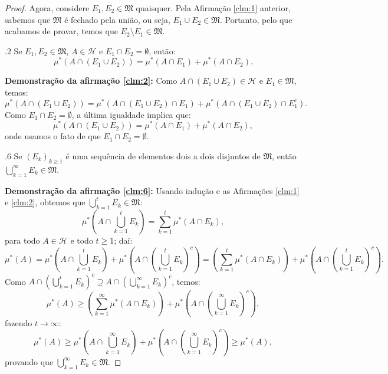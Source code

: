\begin{proof}
    Agora, considere $E_1, E_2 \in \mathfrak{M}$ quaisquer. Pela Afirmação \ref{clm:1} anterior, sabemos que $\mathfrak{M}$ é fechado pela união, ou seja, $E_1 \cup E_2 \in \mathfrak{M}$. Portanto, pelo que acabamos de provar, temos que $E_2 \setminus E_1 \in \mathfrak{M}$.

    \begin{claim}{.}{2}
        Se $E_1, E_2 \in \mathfrak{M}$, $A \in \mathcal{H}$ e $E_1 \cap E_2 = \emptyset$, então:
        \begin{equation*}
            \mu^*(A \cap (E_1 \cup E_2)) = \mu^*(A \cap E_1) + \mu^*(A \cap E_2).
        \end{equation*}
    \end{claim}
    \textbf{Demonstração da afirmação \ref{clm:2}:} Como $A \cap (E_1 \cup E_2) \in \mathcal{H}$ e $E_1 \in \mathfrak{M}$, temos:
    \begin{equation*}
        \mu^*(A \cap (E_1 \cup E_2)) = \mu^*(A \cap (E_1 \cup E_2) \cap E_1) + \mu^*(A \cap (E_1 \cup E_2) \cap E_1^c).
    \end{equation*}
    Como $E_1 \cap E_2 = \emptyset$, a última igualdade implica que:
    \begin{equation*}
        \mu^*(A \cap (E_1 \cup E_2)) = \mu^*(A \cap E_1) + \mu^*(A \cap E_2),
    \end{equation*}
    onde usamos o fato de que $E_1 \cap E_2 = \emptyset$.
    

    \begin{claim}{.}{6}
        Se $(E_k)_{k \geq 1}$ é uma sequência de elementos dois a dois disjuntos de $\mathfrak{M}$, então $\bigcup_{k=1}^{\infty} E_k \in \mathfrak{M}$.
    \end{claim}
    \textbf{Demonstração da afirmação \ref{clm:6}:} Usando indução e as Afirmações \ref{clm:1} e \ref{clm:2}, obtemos que $\bigcup_{k=1}^{t} E_k \in \mathfrak{M}$:
    \begin{equation*}
        \mu^*(A \cap \bigcup_{k=1}^{t} E_k) = \sum_{k=1}^{t} \mu^*(A \cap E_k),
    \end{equation*}
    para todo $A \in \mathcal{H}$ e todo $t \geq 1$; daí:
    \begin{equation*}
        \mu^*(A) = \mu^*(A \cap \bigcup_{k=1}^{t} E_k) + \mu^*(A \cap (\bigcup_{k=1}^{t} E_k)^c) = \left(\sum_{k=1}^{t} \mu^*(A \cap E_k)\right) + \mu^*(A \cap (\bigcup_{k=1}^{t} E_k)^c).
    \end{equation*}
    Como $A \cap (\bigcup_{k=1}^{t} E_k)^c \supseteq A \cap (\bigcup_{k=1}^{\infty} E_k)^c$, temos:
    \begin{equation*}
        \mu^*(A) \geq \left(\sum_{k=1}^{\infty} \mu^*(A \cap E_k)\right) + \mu^*(A \cap (\bigcup_{k=1}^{\infty} E_k)^c),
    \end{equation*}
    fazendo $t \to \infty$:
    \begin{equation*}
        \mu^*(A) \geq \mu^*(A \cap \bigcup_{k=1}^{\infty} E_k) + \mu^*(A \cap (\bigcup_{k=1}^{\infty} E_k)^c) \geq \mu^*(A),
    \end{equation*}
    provando que $\bigcup_{k=1}^{\infty} E_k \in \mathfrak{M}$.
    


\end{proof}
